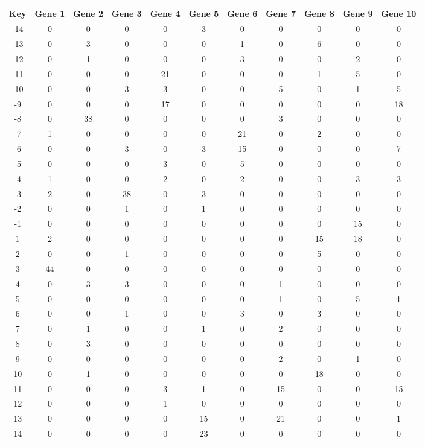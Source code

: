 \begin{tabular}{|c|c|c|c|c|c|c|c|c|c|c|}
\hline
Key & Gene 1 & Gene 2 & Gene 3 & Gene 4 & Gene 5 & Gene 6 & Gene 7 & Gene 8 & Gene 9 & Gene 10 \\
\hline
-14 & 0 & 0 & 0 & 0 & 3 & 0 & 0 & 0 & 0 & 0 \\
-13 & 0 & 3 & 0 & 0 & 0 & 1 & 0 & 6 & 0 & 0 \\
-12 & 0 & 1 & 0 & 0 & 0 & 3 & 0 & 0 & 2 & 0 \\
-11 & 0 & 0 & 0 & 21 & 0 & 0 & 0 & 1 & 5 & 0 \\
-10 & 0 & 0 & 3 & 3 & 0 & 0 & 5 & 0 & 1 & 5 \\
-9 & 0 & 0 & 0 & 17 & 0 & 0 & 0 & 0 & 0 & 18 \\
-8 & 0 & 38 & 0 & 0 & 0 & 0 & 3 & 0 & 0 & 0 \\
-7 & 1 & 0 & 0 & 0 & 0 & 21 & 0 & 2 & 0 & 0 \\
-6 & 0 & 0 & 3 & 0 & 3 & 15 & 0 & 0 & 0 & 7 \\
-5 & 0 & 0 & 0 & 3 & 0 & 5 & 0 & 0 & 0 & 0 \\
-4 & 1 & 0 & 0 & 2 & 0 & 2 & 0 & 0 & 3 & 3 \\
-3 & 2 & 0 & 38 & 0 & 3 & 0 & 0 & 0 & 0 & 0 \\
-2 & 0 & 0 & 1 & 0 & 1 & 0 & 0 & 0 & 0 & 0 \\
-1 & 0 & 0 & 0 & 0 & 0 & 0 & 0 & 0 & 15 & 0 \\
1 & 2 & 0 & 0 & 0 & 0 & 0 & 0 & 15 & 18 & 0 \\
2 & 0 & 0 & 1 & 0 & 0 & 0 & 0 & 5 & 0 & 0 \\
3 & 44 & 0 & 0 & 0 & 0 & 0 & 0 & 0 & 0 & 0 \\
4 & 0 & 3 & 3 & 0 & 0 & 0 & 1 & 0 & 0 & 0 \\
5 & 0 & 0 & 0 & 0 & 0 & 0 & 1 & 0 & 5 & 1 \\
6 & 0 & 0 & 1 & 0 & 0 & 3 & 0 & 3 & 0 & 0 \\
7 & 0 & 1 & 0 & 0 & 1 & 0 & 2 & 0 & 0 & 0 \\
8 & 0 & 3 & 0 & 0 & 0 & 0 & 0 & 0 & 0 & 0 \\
9 & 0 & 0 & 0 & 0 & 0 & 0 & 2 & 0 & 1 & 0 \\
10 & 0 & 1 & 0 & 0 & 0 & 0 & 0 & 18 & 0 & 0 \\
11 & 0 & 0 & 0 & 3 & 1 & 0 & 15 & 0 & 0 & 15 \\
12 & 0 & 0 & 0 & 1 & 0 & 0 & 0 & 0 & 0 & 0 \\
13 & 0 & 0 & 0 & 0 & 15 & 0 & 21 & 0 & 0 & 1 \\
14 & 0 & 0 & 0 & 0 & 23 & 0 & 0 & 0 & 0 & 0 \\
\hline
\end{tabular}